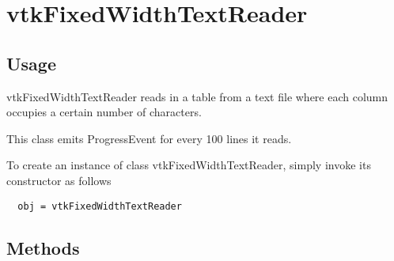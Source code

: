 \section{vtkFixedWidthTextReader}

\subsection{Usage}


 vtkFixedWidthTextReader reads in a table from a text file where
 each column occupies a certain number of characters.
 
 This class emits ProgressEvent for every 100 lines it reads.
 

To create an instance of class vtkFixedWidthTextReader, simply
invoke its constructor as follows
\begin{verbatim}
  obj = vtkFixedWidthTextReader
\end{verbatim}
\subsection{Methods}

